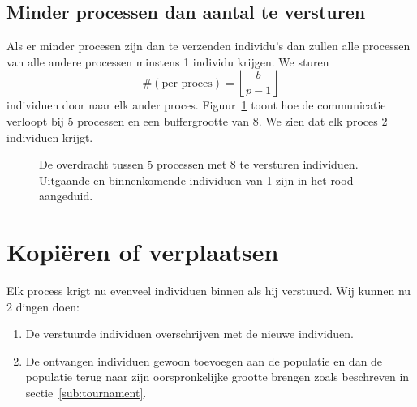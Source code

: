 \subsection{Minder processen dan aantal te versturen}
Als er minder procesen zijn dan te verzenden individu's dan zullen alle processen van alle andere processen minstens 1 individu krijgen. We sturen \[
\#(\text{per proces}) = \left\lfloor \frac{b}{p-1} \right\rfloor
\] individuen door naar elk ander proces.
Figuur~\ref{parr_conn_5} toont hoe de communicatie verloopt bij 5 processen en een buffergrootte van 8. We zien dat elk proces 2 individuen krijgt.
\begin{figure}[H]
\centering
{}
\caption{De overdracht tussen 5 processen met 8 te versturen individuen. Uitgaande en binnenkomende individuen van 1 zijn in het rood aangeduid.}
\label{parr_conn_5}
\end{figure}

\section{Kopiëren of verplaatsen}
\label{sub:toCopyOrNotToCopy}
Elk process krigt nu evenveel individuen binnen als hij verstuurd. Wij kunnen nu 2 dingen doen:
\begin{enumerate}
	\item De verstuurde individuen overschrijven met de nieuwe individuen.
	\item De ontvangen individuen gewoon toevoegen aan de populatie en dan de populatie terug naar zijn oorspronkelijke grootte brengen zoals beschreven in sectie~\ref{sub:tournament}.
\end{enumerate}

